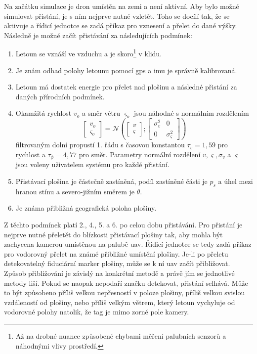     Na začátku simulace je dron umístěn na zemi a není aktivní. Aby bylo možné simulovat přistání, je s ním nejprve nutné vzletět. Toho se docílí tak, že se aktivuje a řídicí jednotce se zadá příkaz pro vznesení a přelet do dané výšky. Následně je možné začít přistávání za následujících podmínek:
    \begin{enumerate}
        \item Letoun se vznáší ve vzduchu a je skoro\footnote[1]{Až na drobné nuance způsobené chybami měření palubních senzorů a náhodnými vlivy prostředí.} v klidu.
        \item Je znám odhad polohy letounu pomocí \acrshort{gps} a \acrshort{imu} je správně kalibrovaná.
        \item Letoun má dostatek energie pro přelet nad plošinu a následné přistání za daných přírodních podmínek.
        \item Okamžitá rychlost $v_o$ a směr větru $\varsigma_o$ jsou náhodné s normálním rozdělením $$\begin{bmatrix}
            v_o\\
            \varsigma_o
        \end{bmatrix} = \mathcal{N}\left(\begin{bmatrix}
            v\\
            \varsigma
        \end{bmatrix}; \begin{bmatrix}
            \sigma_v^2 & 0\\
            0          & \sigma_\varsigma^2
        \end{bmatrix}\right)$$ filtrovaným dolní propustí 1. řádu s časovou konstantou $\tau_v = 1{,}59$ pro rychlost a $\tau_\phi = 4{,}77$ pro směr.
        Parametry normální rozdělení $v, \varsigma, \sigma_v$ a $\varsigma$ jsou voleny uživatelem systému pro každé přistání.
        \item Přistávací plošina je částečně zastíněná, podíl zastíněné části je $p_s$ a úhel mezi hranou stínu a severo-jižním směrem je $\theta$.
        \item Je známa přibližná geografická poloha plošiny.
    \end{enumerate}
    Z těchto podmínek platí 2., 4., 5. a 6. po celou dobu přistávání. Pro přistání je nejprve nutné přeletět do blízkosti přistávací plošiny tak, aby mohla být zachycena kamerou umístěnou na palubě \acrshort{uav}. Řídicí jednotce se tedy zadá příkaz pro vodorovný přelet na známé přibližné umístění plošiny. Je-li po přeletu detekovatelný fiduciární marker plošiny, může se k ní \acrshort{uav} začít přibližovat. Způsob přibližování je závislý na konkrétní metodě a právě jím se jednotlivé metody liší. Pokud se naopak nepodaří značku detekovat, přistání selhává. Může to být způsobeno příliš velkou nepřesností v poloze plošiny, příliš velkou svislou vzdáleností od plošiny, nebo příliš velkým větrem, který letoun vychyluje od vodorovné polohy natolik, že tag je mimo zorné pole kamery.

